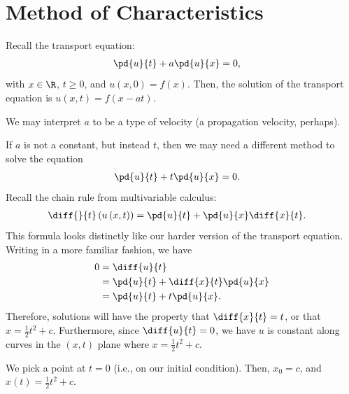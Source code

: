 \documentclass[10pt]{mypackage}
\begin{document}
\section{Method of Characteristics}%
\begin{example}
  Recall the transport equation:
  \begin{align*}
    \pd{u}{t} + a \pd{u}{x} &= 0,
  \end{align*}
  with $x\in\R$, $t\geq 0$, and $u\left( x,0 \right) = f(x)$. Then, the solution of the transport equation is $u\left( x,t \right) = f\left( x-at \right)$.\newline

  We may interpret $a$ to be a type of velocity (a propagation velocity, perhaps).\newline

  If $a$ is not a constant, but instead $t$, then we may need a different method to solve the equation
  \begin{align*}
    \pd{u}{t} + t \pd{u}{x} &= 0.
  \end{align*}
  Recall the chain rule from multivariable calculus:
  \begin{align*}
    \diff{}{t}\left( u\left( x,t \right) \right) &= \pd{u}{t} + \pd{u}{x}\diff{x}{t}.
  \end{align*}
  This formula looks distinctly like our harder version of the transport equation. Writing in a more familiar fashion, we have
  \begin{align*}
    0 &= \diff{u}{t}\\
      &= \pd{u}{t} + \diff{x}{t}\pd{u}{x}\\
      &= \pd{u}{t} + t\pd{u}{x}.
  \end{align*}
  Therefore, solutions will have the property that $\diff{x}{t} = t$, or that $x = \frac{1}{2}t^2 + c$. Furthermore, since $\diff{u}{t} = 0$, we have $u$ is constant along curves in the $\left( x,t \right)$ plane where $x = \frac{1}{2}t^2 + c$.\newline

  We pick a point at $t = 0$ (i.e., on our initial condition). Then, $x_0 = c$, and $x(t) = \frac{1}{2}t^2 + c$.\newline


\end{example}
\end{document}
